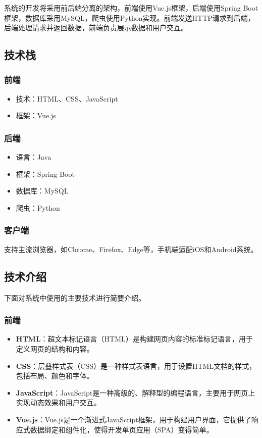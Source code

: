 \documentclass[12pt]{article}
\begin{document}
系统的开发将采用前后端分离的架构，前端使用Vue.js框架，后端使用Spring Boot框架，数据库采用MySQL，爬虫使用Python实现。前端发送HTTP请求到后端，后端处理请求并返回数据，前端负责展示数据和用户交互。

\subsection{技术栈}

\subsubsection{前端}
\begin{itemize}
    \item 技术：HTML、CSS、JavaScript
    \item 框架：Vue.js
\end{itemize}

\subsubsection{后端}
\begin{itemize}
    \item 语言：Java
    \item 框架：Spring Boot
    \item 数据库：MySQL
    \item 爬虫：Python
\end{itemize}

\subsubsection{客户端}
支持主流浏览器，如Chrome、Firefox、Edge等，手机端适配iOS和Android系统。

\subsection{技术介绍}
下面对系统中使用的主要技术进行简要介绍。
\subsubsection{前端}
\begin{itemize}
    \item \textbf{HTML}：超文本标记语言（HTML）是构建网页内容的标准标记语言，用于定义网页的结构和内容。
    \item \textbf{CSS}：层叠样式表（CSS）是一种样式表语言，用于设置HTML文档的样式，包括布局、颜色和字体。
    \item \textbf{JavaScript}：JavaScript是一种高级的、解释型的编程语言，主要用于网页上实现动态效果和用户交互。
    \item \textbf{Vue.js}：Vue.js是一个渐进式JavaScript框架，用于构建用户界面，它提供了响应式数据绑定和组件化，使得开发单页应用（SPA）变得简单。
\end{itemize}
\end{document}
